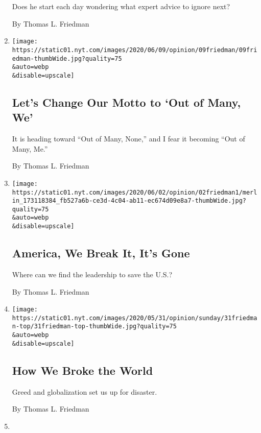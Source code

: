 \begin{enumerate}
  Does he start each day wondering what expert advice to ignore next?

  By Thomas L. Friedman
\item
  \href{/2020/06/09/opinion/trump-united-states.html}{}

  \texttt{[image: https://static01.nyt.com/images/2020/06/09/opinion/09friedman/09friedman-thumbWide.jpg?quality=75\\\&auto=webp\\\&disable=upscale]}

  \hypertarget{lets-change-our-motto-to-out-of-many-we}{%
  \subsection{Let's Change Our Motto to `Out of Many,
  We'}\label{lets-change-our-motto-to-out-of-many-we}}

  It is heading toward ``Out of Many, None,'' and I fear it becoming
  ``Out of Many, Me.''

  By Thomas L. Friedman
\item
  \href{/2020/06/02/opinion/trump-george-floyd-america.html}{}

  \texttt{[image: https://static01.nyt.com/images/2020/06/02/opinion/02friedman1/merlin\_173118384\_fb527a6b-ce3d-4c04-ab11-ec674d09e8a7-thumbWide.jpg?quality=75\\\&auto=webp\\\&disable=upscale]}

  \hypertarget{america-we-break-it-its-gone}{%
  \subsection{America, We Break It, It's
  Gone}\label{america-we-break-it-its-gone}}

  Where can we find the leadership to save the U.S.?

  By Thomas L. Friedman
\item
  \href{/2020/05/30/opinion/sunday/coronavirus-globalization.html}{}

  \texttt{[image: https://static01.nyt.com/images/2020/05/31/opinion/sunday/31friedman-top/31friedman-top-thumbWide.jpg?quality=75\\\&auto=webp\\\&disable=upscale]}

  \hypertarget{how-we-broke-the-world}{%
  \subsection{How We Broke the World}\label{how-we-broke-the-world}}

  Greed and globalization set us up for disaster.

  By Thomas L. Friedman
\item
  \href{/2020/05/26/opinion/mike-pompeo.html}{}


\end{enumerate}
